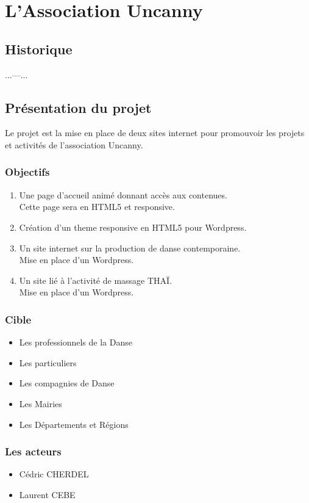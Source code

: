\documentclass[11pt,a4paper]{report}
\begin{document}
\chapter{L'Association Uncanny}
	\section{Historique}
		...---...
	\section{Présentation du projet}
		Le projet est la mise en place de deux sites internet pour promouvoir les projets et activités de l'association Uncanny. 
		\subsection{Objectifs}
			\begin{enumerate}
				\item Une page d'accueil animé donnant accès aux contenues.\\
				Cette page sera en HTML5 et responsive.
				\item Création d'un theme responsive en HTML5 pour Wordpress.
				\item Un site internet sur la production de danse contemporaine.\\
				Mise en place d'un Wordpress.
				\item Un site lié à l'activité de massage THAÏ.\\
				Mise en place d'un Wordpress.
			\end{enumerate}
		\subsection{Cible}
			\begin{itemize}
				\item Les professionnels de la Danse
				\item Les particuliers
				\item Les compagnies de Danse
				\item Les Mairies
				\item Les Départements et Régions
			\end{itemize}
		\subsection{Les acteurs}
			\begin{itemize}
				\item Cédric CHERDEL
				\item Laurent CEBE
			\end{itemize}
\end{document}
